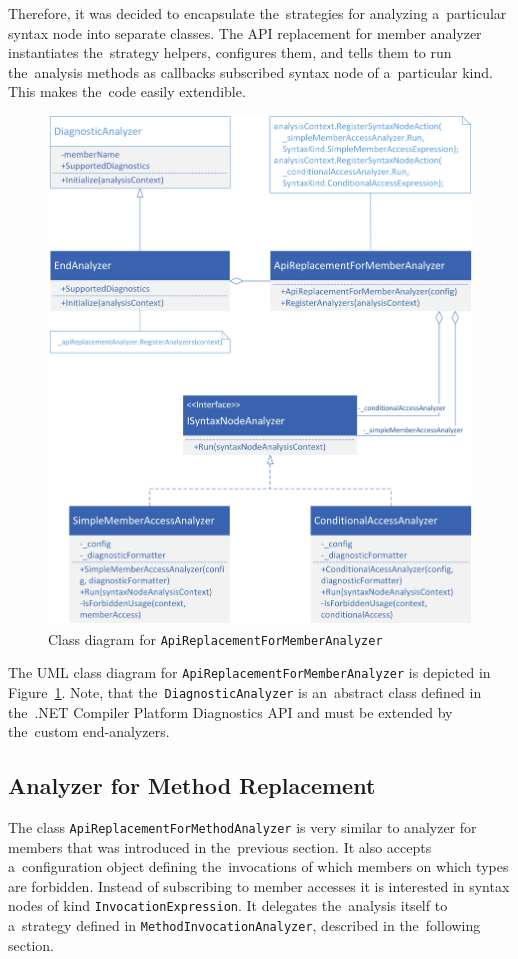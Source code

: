 \documentclass[
  digital, %
  table,   %
  lof,     %
  lot,     %
  oneside,
]{fithesis3}
\begin{document}
Therefore, it was decided to encapsulate the~strategies for analyzing a~particular syntax node into separate classes. The API replacement for member analyzer instantiates the~strategy helpers, configures them, and tells them to run the~analysis methods as callbacks subscribed syntax node of a~particular kind. This makes the~code easily extendible.

\begin{figure}[h!]
		\centering
			\includegraphics[scale=0.8]{img/uml/api-replacement-for-member}
		\caption{Class diagram for \texttt{ApiReplacementForMemberAnalyzer}}
		\label{fig:uml-api-replacement-for-member}
\end{figure}

The UML class diagram for \texttt{ApiReplacementForMemberAnalyzer} is depicted in Figure~\ref{fig:uml-api-replacement-for-member}. Note, that the~\texttt{DiagnosticAnalyzer} is an~abstract class defined in the~.NET Compiler Platform Diagnostics API and must be extended by the~custom end-analyzers.

\subsection{Analyzer for Method Replacement}
The class \texttt{ApiReplacementForMethodAnalyzer} is very similar to analyzer for members that was introduced in the~previous section. It also accepts a~configuration object defining the~invocations of which members on which types are forbidden. 
Instead of subscribing to member accesses it is interested in syntax nodes of kind \texttt{InvocationExpression}. It delegates the~analysis itself to a~strategy defined in \texttt{MethodInvocationAnalyzer}, described in the~following section.
\end{document}
